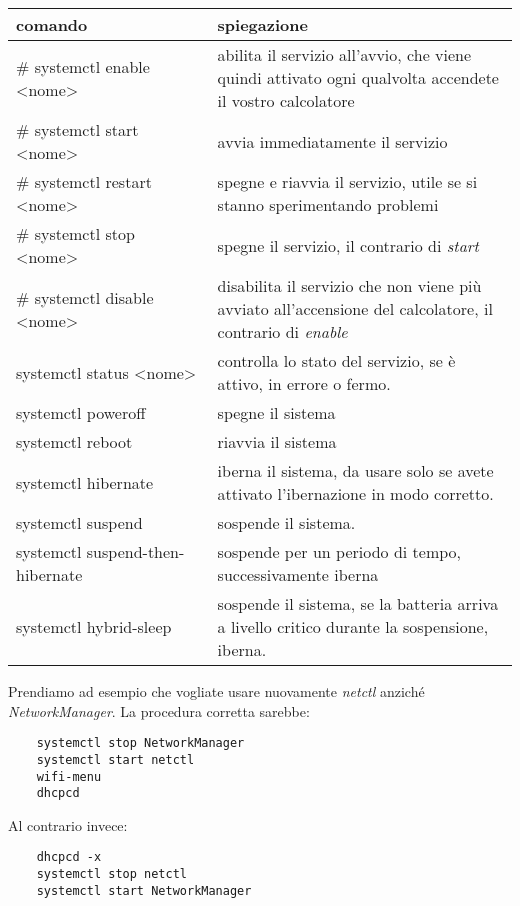 \documentclass[twoside,italian]{book}
\begin{document}
			\begin{flushleft}
				\begin{tabu}{|>{\color{white} }m{0.4\linewidth}|>{}m{0.6\linewidth}}
					\hline
					\textbf{comando} & \textbf{spiegazione} \\
					\hline \hline
					\# systemctl enable <nome> & abilita il servizio all'avvio, che viene quindi attivato ogni qualvolta accendete il vostro calcolatore \\ 
					\hline
					\# systemctl start <nome> & avvia immediatamente il servizio \\
					\hline
					\# systemctl restart <nome> & spegne e riavvia il servizio, utile se si stanno sperimentando problemi \\
					\hline
					\# systemctl stop <nome> & spegne il servizio, il contrario di \textit{start} \\ 
					\hline
					\# systemctl disable <nome> & disabilita il servizio che non viene più avviato all'accensione del calcolatore, il contrario di \textit{enable} \\ 
					\hline
					systemctl status <nome> & controlla lo stato del servizio, se è attivo, in errore o fermo. \\
					\hline
					systemctl poweroff & spegne il sistema \\
					\hline
					systemctl reboot & riavvia il sistema \\
					\hline
					systemctl hibernate & iberna il sistema, da usare solo se avete attivato l'ibernazione in modo corretto.\\
					\hline 
					systemctl suspend & sospende il sistema.\\
					\hline
					systemctl suspend-then-hibernate & sospende per un periodo di tempo, successivamente iberna \\ 
					\hline
					systemctl hybrid-sleep & sospende il sistema, se la batteria arriva a livello critico durante la sospensione, iberna. \\
					\hline
					
					
					
				\end{tabu}
			\end{flushleft}
		
			Prendiamo ad esempio che vogliate usare nuovamente \textit{netctl} anziché \textit{NetworkManager}. La procedura corretta sarebbe:
\begin{lstlisting}
	systemctl stop NetworkManager
	systemctl start netctl
	wifi-menu
	dhcpcd
\end{lstlisting}
			Al contrario invece:
\begin{lstlisting}
	dhcpcd -x
	systemctl stop netctl
	systemctl start NetworkManager
\end{lstlisting}
			
\end{document}
